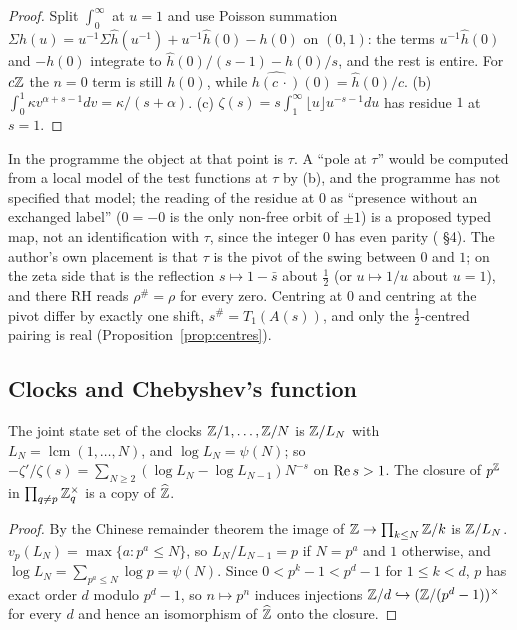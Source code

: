 \begin{proof}
Split $\int_0^\infty$ at $u=1$ and use Poisson summation $\Sigma h(u)=u^{-1}\Sigma\hat h(u^{-1})+u^{-1}\hat h(0)-h(0)$ on $(0,1)$: the terms $u^{-1}\hat h(0)$ and $-h(0)$ integrate to $\hat h(0)/(s-1)-h(0)/s$, and the rest is entire. For $c\mathbb{Z}$ the $n=0$ term is still $h(0)$, while $\widehat{h(c\,\cdot)}(0)=\hat h(0)/c$. (b) $\int_0^1\kappa v^{\alpha+s-1}dv=\kappa/(s+\alpha)$. (c) $\zeta(s)=s\int_1^\infty\lfloor u\rfloor u^{-s-1}du$ has residue $1$ at $s=1$.
\end{proof}

In the programme the object at that point is $\tau$. A ``pole at $\tau$'' would be computed from a local model of the test functions at $\tau$ by (b), and the programme has not specified that model; the reading of the residue at $0$ as ``presence without an exchanged label'' ($0=-0$ is the only non-free orbit of $\pm1$) is a proposed typed map, not an identification with $\tau$, since the integer $0$ has even parity ( §4). The author's own placement is that $\tau$ is the pivot of the swing between $0$ and $1$; on the zeta side that is the reflection $s\mapsto1-\bar s$ about $\tfrac12$ (or $u\mapsto1/u$ about $u=1$), and there RH reads $\rho^\#=\rho$ for every zero. Centring at $0$ and centring at the pivot differ by exactly one shift, $s^\#=T_1(A(s))$, and only the $\tfrac12$-centred pairing is real (Proposition~\ref{prop:centres}).

\subsection{Clocks and Chebyshev's function}

\begin{proposition}\label{prop:clocks}
The joint state set of the clocks $\mathbb{Z}/1,\dots,\mathbb{Z}/N$ is $\mathbb{Z}/L_N$ with $L_N=\operatorname{lcm}(1,\dots,N)$, and $\log L_N=\psi(N)$; so $-\zeta'/\zeta(s)=\sum_{N\ge2}(\log L_N-\log L_{N-1})N^{-s}$ on $\operatorname{Re} s>1$. The closure of $p^{\mathbb{Z}}$ in $\prod_{q\ne p}\mathbb{Z}_q^\times$ is a copy of $\widehat{\mathbb{Z}}$.
\end{proposition}

\begin{proof}
By the Chinese remainder theorem the image of $\mathbb{Z}\to\prod_{k\le N}\mathbb{Z}/k$ is $\mathbb{Z}/L_N$. $v_p(L_N)=\max\{a:p^a\le N\}$, so $L_N/L_{N-1}=p$ if $N=p^a$ and $1$ otherwise, and $\log L_N=\sum_{p^a\le N}\log p=\psi(N)$. Since $0<p^k-1<p^d-1$ for $1\le k<d$, $p$ has exact order $d$ modulo $p^d-1$, so $n\mapsto p^n$ induces injections $\mathbb{Z}/d\hookrightarrow(\mathbb{Z}/(p^d-1))^\times$ for every $d$ and hence an isomorphism of $\widehat{\mathbb{Z}}$ onto the closure.
\end{proof}

